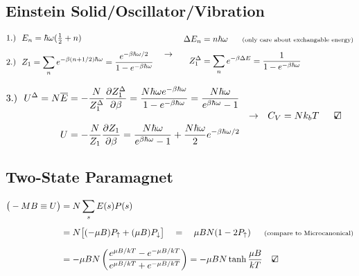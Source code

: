 \documentclass[12pt]{article}
\newcommand{\checkedbox}{\mbox{\ooalign{$\checkmark$\cr\hidewidth$\square$\hidewidth\cr}}} %
\begin{document}
\vspace{10pt}
\subsection{Einstein Solid/Oscillator/Vibration}

\vspace{5pt}
\(
    \begin{aligned}
        &1.)\ \ E_n = \hbar \omega (\tfrac{1}{2} + n)\\[5pt]
        &2.)\ \ Z_1 = \sum_n e^{-\beta (n + 1/2)\hbar \omega} 
            = \frac{e^{-\beta \hbar \omega / 2}}{1-e^{-\beta \hbar \omega}}
    \end{aligned} 
    \ \ \ \rightarrow \ \ \
    \begin{aligned}
        \Delta E_n &= n \hbar \omega \ \ \ \ \ \text{\scriptsize(only care about exchangable energy)}\\[5pt]
        Z_1^\Delta &= \sum_n e^{-\beta \Delta E} = \frac{1}{1-e^{-\beta \hbar \omega}}
    \end{aligned}
\)

\vspace{10pt}\noindent
\(
    \begin{aligned}
        3.) \ \ U^\Delta = N \overline{E} &= - \frac{N}{Z_1^\Delta} \frac{\partial Z_1^\Delta}{\partial \beta} 
            = \frac{N \hbar \omega e^{-\beta \hbar \omega}}{1-e^{-\beta \hbar \omega}}
            = \frac{N \hbar \omega}{e^{\beta \hbar \omega} - 1}\\[10pt]
        U &= - \frac{N}{Z_1} \frac{\partial Z_1}{\partial \beta}
            = \frac{N \hbar \omega}{e^{\beta \hbar \omega} - 1} 
            + \frac{N\hbar\omega}{2} e^{-\beta \hbar \omega/2}\\
    \end{aligned}
    \ \ \rightarrow \ \ C_V = Nk_bT \indent \checkedbox 
\)

\newpage

\subsection{Two-State Paramagnet}
\(\begin{aligned}[t]
    \big( - M B \equiv U \big) &= N \sum_s E(s) P(s) \\[5pt]
    &= N \big[ (-\mu B) P_\uparrow + (\mu B) P_\downarrow \big] 
        \ \ \ = \ \ \ \mu B N(1 - 2P_\uparrow)  \indent \text{\scriptsize(compare to Microcanonical)}\\[7pt]
    &= - \mu B N \left( \frac{ e^{\mu B / kT} - e^{-\mu B / kT} }{ e^{\mu B / kT} + e^{- \mu B / kT} } \right)
        = -\mu B N \tanh{ \frac{\mu B}{k T} } \ \ \ \checkedbox
\end{aligned}\)
\end{document}
